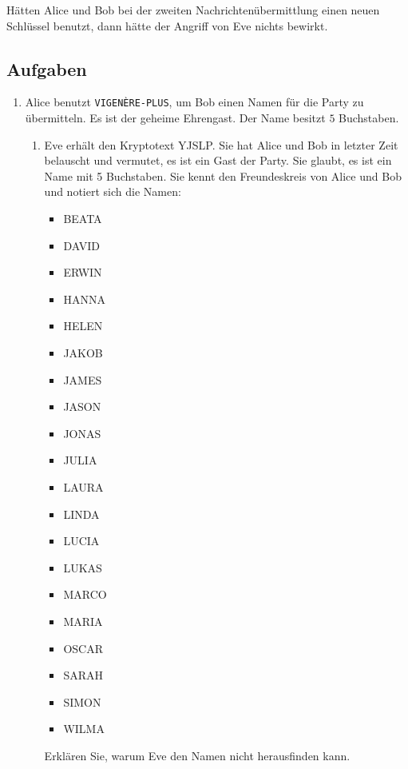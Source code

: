 \begin{important}
	Hätten Alice und Bob bei der zweiten Nachrichtenübermittlung einen neuen Schlüssel benutzt, dann hätte der Angriff von Eve nichts bewirkt.
\end{important}

\newpage

\subsection{Aufgaben}

\begin{enumerate}
	\item Alice benutzt \texttt{VIGENÈRE-PLUS}, um Bob einen Namen für die Party zu übermitteln. Es ist der geheime Ehrengast. Der Name besitzt $5$ Buchstaben.
	\begin{enumerate}
		\item Eve erhält den Kryptotext YJSLP. Sie hat Alice und Bob in letzter Zeit belauscht und vermutet, es ist ein Gast der Party. Sie glaubt, es ist ein Name mit \num{5} Buchstaben. Sie kennt den Freundeskreis von Alice und Bob und notiert sich die Namen:
			\begin{multicols}{5}
				\begin{itemize}
					\item BEATA
					\item DAVID
					\item ERWIN
					\item HANNA
					\item HELEN
					\item JAKOB
					\item JAMES
					\item JASON
					\item JONAS
					\item JULIA
					\item LAURA
					\item LINDA
					\item LUCIA
					\item LUKAS
					\item MARCO
					\item MARIA
					\item OSCAR
					\item SARAH
					\item SIMON
					\item WILMA 
				\end{itemize}
			\end{multicols}
			Erklären Sie, warum Eve den Namen nicht herausfinden kann.
			

\end{enumerate}
\end{enumerate}
